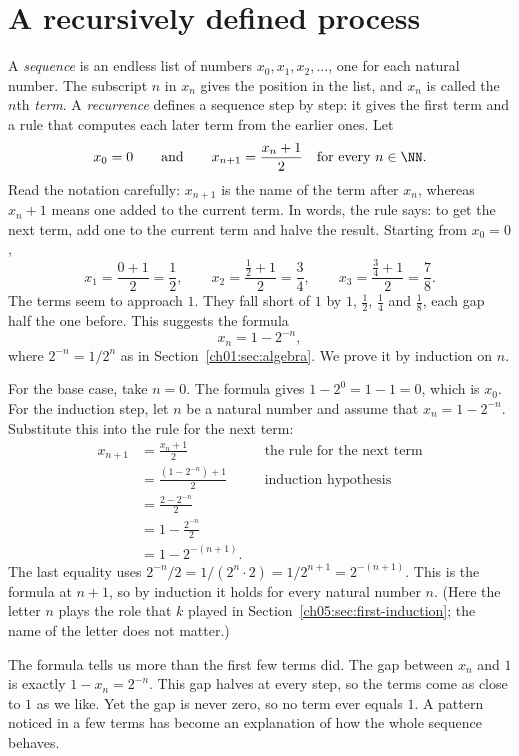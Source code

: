 \section{A recursively defined process}\label{ch05:sec:recurrence}
A \emph{sequence} is an endless list of numbers $x_0,x_1,x_2,\ldots$, one for each natural number. The subscript $n$ in $x_n$ gives the position in the list, and $x_n$ is called the $n$th \emph{term}. A \emph{recurrence} defines a sequence step by step: it gives the first term and a rule that computes each later term from the earlier ones. Let
\[
x_0=0\qquad\text{and}\qquad x_{n+1}=\frac{x_n+1}{2}\quad\text{for every } n\in\NN.
\]
Read the notation carefully: $x_{n+1}$ is the name of the term after $x_n$, whereas $x_n+1$ means one added to the current term. In words, the rule says: to get the next term, add one to the current term and halve the result. Starting from $x_0=0$,
\[
x_1=\frac{0+1}{2}=\frac12,\qquad x_2=\frac{\frac12+1}{2}=\frac34,\qquad x_3=\frac{\frac34+1}{2}=\frac78.
\]
The terms seem to approach $1$. They fall short of $1$ by $1$, $\tfrac12$, $\tfrac14$ and $\tfrac18$, each gap half the one before. This suggests the formula
\[
x_n=1-2^{-n},
\]
where $2^{-n}=1/2^n$ as in Section~\ref{ch01:sec:algebra}. We prove it by induction on $n$.

For the base case, take $n=0$. The formula gives $1-2^{0}=1-1=0$, which is $x_0$. For the induction step, let $n$ be a natural number and assume that $x_n=1-2^{-n}$. Substitute this into the rule for the next term:
\begin{align*}
 x_{n+1}
 &=\frac{x_n+1}{2} &&\text{the rule for the next term}\\
 &=\frac{(1-2^{-n})+1}{2} &&\text{induction hypothesis}\\
 &=\frac{2-2^{-n}}2\\
 &=1-\frac{2^{-n}}2\\
 &=1-2^{-(n+1)}.
\end{align*}
The last equality uses $2^{-n}/2=1/(2^n\cdot2)=1/2^{n+1}=2^{-(n+1)}$. This is the formula at $n+1$, so by induction it holds for every natural number $n$. (Here the letter $n$ plays the role that $k$ played in Section~\ref{ch05:sec:first-induction}; the name of the letter does not matter.)

The formula tells us more than the first few terms did. The gap between $x_n$ and $1$ is exactly $1-x_n=2^{-n}$. This gap halves at every step, so the terms come as close to $1$ as we like. Yet the gap is never zero, so no term ever equals $1$. A pattern noticed in a few terms has become an explanation of how the whole sequence behaves.

